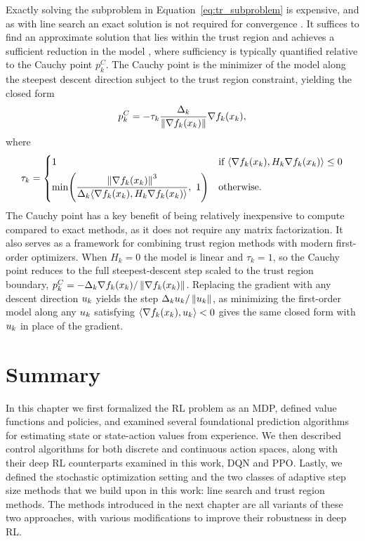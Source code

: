 Exactly solving the subproblem in Equation~\eqref{eq:tr_subproblem} is expensive, and as with line search an exact solution is not required for convergence \cite{nocedal2006numerical}. It suffices to find an approximate solution that lies within the trust region and achieves a sufficient reduction in the model \cite{nocedal2006numerical}, where sufficiency is typically quantified relative to the Cauchy point $p_k^C$. The Cauchy point is the minimizer of the model along the steepest descent direction subject to the trust region constraint, yielding the closed form
\begin{equation}
    p_k^C = -\tau_k \frac{\Delta_k}{\left \lVert \nabla f_k(x_{k}) \right \rVert} \nabla f_k(x_{k}),
    \label{eq:cauchy_point}
\end{equation}
where
\begin{equation}
    \tau_k =
    \begin{cases}
        1 & \text{if } \langle \nabla f_k(x_{k}), H_k \nabla f_k(x_{k}) \rangle \le 0 \\[4pt]
        \min\!\left( \dfrac{\left \lVert \nabla f_k(x_{k}) \right \rVert^3}{\Delta_k \langle \nabla f_k(x_{k}), H_k \nabla f_k(x_{k}) \rangle},\ 1 \right) & \text{otherwise.}
    \end{cases}
    \label{eq:cauchy_tau}
\end{equation}
The Cauchy point has a key benefit of being relatively inexpensive to compute compared to exact methods, as it does not require any matrix factorization. It also serves as a framework for combining trust region methods with modern first-order optimizers. When $H_k = 0$ the model is linear and $\tau_k = 1$, so the Cauchy point reduces to the full steepest-descent step scaled to the trust region boundary, $p_k^C = -\Delta_k \nabla f_k(x_{k}) / \left \lVert \nabla f_k(x_{k}) \right \rVert$. Replacing the gradient with any descent direction $u_{k}$ yields the step $\Delta_k u_{k} / \left \lVert u_{k} \right \rVert$, as minimizing the first-order model along any $u_{k}$ satisfying $\langle \nabla f_k(x_{k}), u_{k} \rangle < 0$ gives the same closed form with $u_{k}$ in place of the gradient.

\section{Summary}
In this chapter we first formalized the RL problem as an MDP, defined value functions and policies, and examined several foundational prediction algorithms for estimating state or state-action values from experience. We then described control algorithms for both discrete and continuous action spaces, along with their deep RL counterparts examined in this work, DQN and PPO. Lastly, we defined the stochastic optimization setting and the two classes of adaptive step size methods that we build upon in this work: line search and trust region methods. The methods introduced in the next chapter are all variants of these two approaches, with various modifications to improve their robustness in deep RL.


